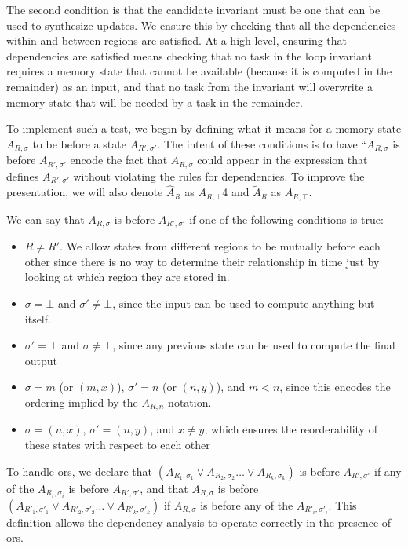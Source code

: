 \documentclass[12pt,letterpaper]{article}
\begin{document}
The second condition is that the candidate invariant must be one that can be used to synthesize updates.
We ensure this by checking that all the dependencies within and between regions are satisfied.
At a high level, ensuring that dependencies are satisfied means checking that no task in the loop invariant requires a memory state that cannot be available (because it is computed in the remainder) as an input, and that no task from the invariant will overwrite a memory state that will be needed by a task in the remainder.

To implement such a test, we begin by defining what it means for a memory state $A_{R, \sigma}$ to be before a state $A_{R', \sigma'}$.
The intent of these conditions is to have ``$A_{R, \sigma}$ is before $A_{R', \sigma'}$ encode the fact that $A_{R, \sigma}$ could appear in the expression that defines $A_{R', \sigma'}$ without violating the rules for dependencies.
To improve the presentation, we will also denote $\hat{A}_R$ as $A_{R, \bot}$4 and $\widetilde{A}_R$ as $A_{R, \top}$.

We can say that $A_{R, \sigma}$ is before $A_{R', \sigma'}$ if one of the following conditions is true:
\begin{itemize}
\item $R \neq R'$. We allow states from different regions to be mutually before each other since there is no way to determine their relationship in time just by looking at which region they are stored in.
\item $\sigma = \bot$ and $\sigma' \neq \bot$, since the input can be used to compute anything but itself.
\item $\sigma' = \top$ and $\sigma \neq \top$, since any previous state can be used to compute the final output
\item $\sigma = m$ (or $(m, x)$), $\sigma' = n$ (or $(n, y)$), and $m < n$, since this encodes the ordering implied by the $A_{R, n}$ notation.
\item $\sigma = (n, x)$, $\sigma' = (n, y)$, and $x \neq y$, which ensures the reorderability of these states with respect to each other
\end{itemize}

To handle ors, we declare that $(A_{R_1, \sigma_1} \vee A_{R_2, \sigma_2} \ldots \vee A_{R_k, \sigma_k})$ is before $A_{R', \sigma'}$ if any of the $A_{R_i, \sigma_i}$ is before $A_{R', \sigma'}$, and that $A_{R, \sigma}$ is before $(A_{R'_1, \sigma'_1} \vee A_{R'_2, \sigma'_2} \ldots \vee A_{R'_k, \sigma'_k})$ if $A_{R, \sigma}$ is before any of the $A_{R'_i, \sigma'_i}$.
This definition allows the dependency analysis to operate correctly in the presence of ors.
\end{document}
